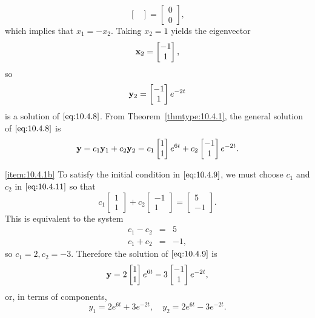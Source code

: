\documentclass{ximera}
\begin{document}
\begin{example}
\begin{explanation}
$$\begin{bmatrix}
\end{bmatrix}=\begin{bmatrix} 0\\0\end{bmatrix},
$$
which implies that $x_1=-x_2$.  Taking $x_2=1$ yields the eigenvector
$$
{\bf x}_2=\begin{bmatrix}-1\\1\end{bmatrix},
$$
so
$$
{\bf y}_2=\begin{bmatrix}-1\\1\end{bmatrix}e^{-2t}
$$
is a solution of  $\eqref{eq:10.4.8}$.
From Theorem~\ref{thmtype:10.4.1}, the general solution of
$\eqref{eq:10.4.8}$ is
\begin{equation}\label{eq:10.4.11}
{\bf y}=c_1{\bf y}_1+c_2{\bf y}_2=c_1\begin{bmatrix}1\\1
\end{bmatrix}e^{6t}+c_2\begin{bmatrix}-1\\1
\end{bmatrix}e^{-2t}.
\end{equation}


\ref{item:10.4.1b}
 To satisfy the initial condition in  $\eqref{eq:10.4.9}$, we must choose
$c_1$ and $c_2$ in  $\eqref{eq:10.4.11}$ so that
$$
c_1\begin{bmatrix}1\\1\end{bmatrix}+c_2\begin{bmatrix}-1\\
1\end{bmatrix}=\begin{bmatrix}5\\-1
\end{bmatrix}.
$$
This is equivalent to the system
\begin{eqnarray*}
c_1-c_2&=&5\\
c_1+c_2&=&-1,
\end{eqnarray*}
so $c_1=2, c_2=-3$.  Therefore the solution of
$\eqref{eq:10.4.9}$ is
$$
{\bf y}=2\begin{bmatrix}1\\1\end{bmatrix}e^{6t}-3
\begin{bmatrix}-1\\1\end{bmatrix}e^{-2t},
$$
or, in terms of components,
$$
y_1=2e^{6t}+3e^{-2t},\quad y_2=2e^{6t}-3e^{-2t}.
$$
\end{explanation}
\end{example}
\end{document}
